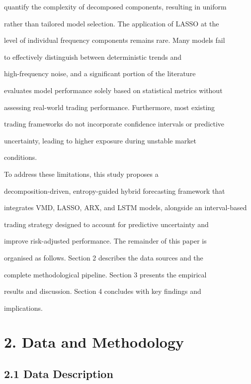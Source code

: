 quantify the complexity of decomposed components, resulting in uniform

rather than tailored model selection. The application of LASSO at the

level of individual frequency components remains rare. Many models fail

to effectively distinguish between deterministic trends and

high-frequency noise, and a significant portion of the literature

evaluates model performance solely based on statistical metrics without

assessing real-world trading performance. Furthermore, most existing

trading frameworks do not incorporate confidence intervals or predictive

uncertainty, leading to higher exposure during unstable market

conditions.



To address these limitations, this study proposes a

decomposition-driven, entropy-guided hybrid forecasting framework that

integrates VMD, LASSO, ARX, and LSTM models, alongside an interval-based

trading strategy designed to account for predictive uncertainty and

improve risk-adjusted performance. The remainder of this paper is

organised as follows. Section 2 describes the data sources and the

complete methodological pipeline. Section 3 presents the empirical

results and discussion. Section 4 concludes with key findings and

implications.



\section{2. Data and Methodology}\label{data-and-methodology}



\subsection{2.1 Data Description}\label{data-description}



